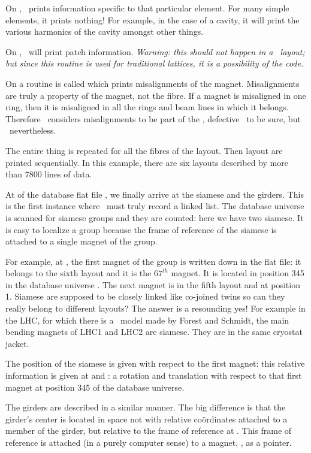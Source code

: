 {{  On , \PTC\ prints information specific to that particular element. For many simple elements, it prints nothing! For example, in the case of a cavity, it will print the various harmonics of the cavity amongst other things. 

On , \PTC\ will print patch information. \emph{Warning: this should not happen in a \DNA\ layout; but since this routine is used for traditional lattices, it is a possibility of the code.} 

On  a routine is called which prints misalignments of the magnet. Misalignments are truly a property of the magnet, not the fibre.  If a magnet is misaligned in one ring, then it is misaligned in all the rings and beam lines in which it belongs. Therefore \PTC\ considers misalignments to be part of the \DNA , defective \DNA\ to be sure, but \DNA\ nevertheless. 
 
The entire thing is repeated for all the fibres of the layout. Then layout are printed sequentially. In this example, there are six layouts described by more than  7800 lines of data. 

At  of the database flat file , we finally arrive at the siamese and the girders. This is the first instance where \PTC\ must truly record a linked list.  The database universe is scanned for siamese groups and they are counted: here we have two siamese. It is easy to localize a group because the frame of reference of the siamese is attached to a single magnet of the group. 

For example, at , the first magnet of the group is written down in the flat file:  it belongs to the sixth layout and it is the $67^{th}$ magnet. It is located in position 345 in the database universe . The next magnet is in the fifth layout and at position 1.  Siamese are supposed to be closely linked like co-joined twins so can they really belong to different layouts? The answer is a resounding yes! For example in the LHC, for which there is a \PTC\ model made by Forest and Schmidt, the main bending magnets of LHC1 and LHC2 are siamese. They are in the same cryostat jacket. 

The position of the siamese is given with respect to the first magnet: this relative information is given at  and  : a rotation and translation with respect to that first magnet at position 345 of the database universe.


The girders are described in a similar manner. The big difference is that the girder's center is located in space not with relative co\"ordinates attached to a member of the girder, but relative to the  frame of reference at  . This frame of reference is attached (in a purely computer sense) to a magnet, , as a pointer. 

}}
